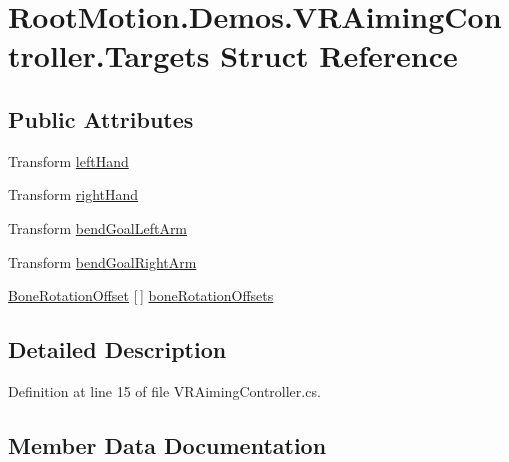 \hypertarget{struct_root_motion_1_1_demos_1_1_v_r_aiming_controller_1_1_targets}{}\section{Root\+Motion.\+Demos.\+V\+R\+Aiming\+Controller.\+Targets Struct Reference}
\label{struct_root_motion_1_1_demos_1_1_v_r_aiming_controller_1_1_targets}
\subsection*{Public Attributes}
\begin{DoxyCompactItemize}
\item 
Transform \mbox{\hyperlink{struct_root_motion_1_1_demos_1_1_v_r_aiming_controller_1_1_targets_ac676b7c8b1abe41955cd968174303999}{left\+Hand}}
\item 
Transform \mbox{\hyperlink{struct_root_motion_1_1_demos_1_1_v_r_aiming_controller_1_1_targets_a49ee9c533d1c84c8016a165c5ce8b1d0}{right\+Hand}}
\item 
Transform \mbox{\hyperlink{struct_root_motion_1_1_demos_1_1_v_r_aiming_controller_1_1_targets_a47cb84b265ce27c29a3d067c3d4a1b57}{bend\+Goal\+Left\+Arm}}
\item 
Transform \mbox{\hyperlink{struct_root_motion_1_1_demos_1_1_v_r_aiming_controller_1_1_targets_a11685abe96614eb9ca0a2c1490903605}{bend\+Goal\+Right\+Arm}}
\item 
\mbox{\hyperlink{class_root_motion_1_1_demos_1_1_v_r_aiming_controller_1_1_bone_rotation_offset}{Bone\+Rotation\+Offset}} \mbox{[}$\,$\mbox{]} \mbox{\hyperlink{struct_root_motion_1_1_demos_1_1_v_r_aiming_controller_1_1_targets_ab0ef2ae0ee9f0dfabfd405596344dbaf}{bone\+Rotation\+Offsets}}
\end{DoxyCompactItemize}


\subsection{Detailed Description}


Definition at line 15 of file V\+R\+Aiming\+Controller.\+cs.



\subsection{Member Data Documentation}
\mbox{\label{struct_root_motion_1_1_demos_1_1_v_r_aiming_controller_1_1_targets_a47cb84b265ce27c29a3d067c3d4a1b57}} 
